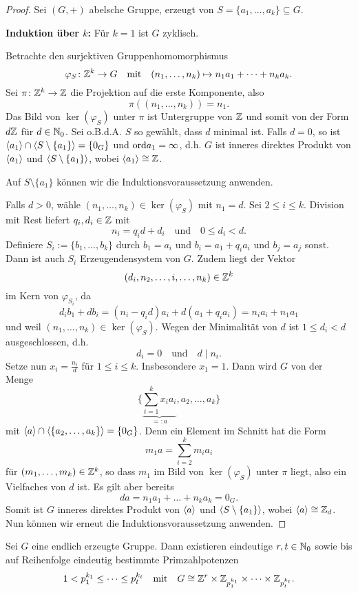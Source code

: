 \begin{proof}
	Sei $(G, +)$ abelsche Gruppe, erzeugt von $S = \{a_1, \dots, a_k\} \subseteq G$. 
	
	\textbf{Induktion über $k$:} Für $k = 1$ ist $G$ zyklisch.
	
	Betrachte den surjektiven Gruppenhomomorphismus
	\[\varphi_S \colon \mathbb{Z}^k \to G \quad\text{mit}\quad(n_1, \dots, n_k) \mapsto n_1a_1 + \dots + n_ka_k.\]
	Sei $\pi \colon \mathbb{Z}^k \to \mathbb{Z}$ die Projektion auf die erste Komponente, also
	\[\pi((n_1, \dots, n_k)) = n_1.\]
	Das Bild von $\ker(\varphi_S)$ unter $\pi$ ist Untergruppe von $\mathbb{Z}$ und somit von der Form $d\mathbb{Z}$ für $d \in \mathbb{N}_0$. Sei o.B.d.A. $S$ so gewählt, dass $d$ minimal ist. Falls $d = 0$, so ist $\langle a_1 \rangle \cap \langle S\setminus\{a_1\} \rangle= \{0_G\}$ und $\mathrm{ord}{a_1} = \infty$, d.h. $G$ ist inneres direktes Produkt von $\langle a_1 \rangle$ und $\langle S\setminus\{a_1\} \rangle$, wobei $\langle a_1 \rangle \cong \mathbb{Z}$.
	
	Auf $S\setminus\{a_1\}$ können wir die Induktionsvoraussetzung anwenden. 
	
	Falls $d > 0$, wähle $(n_1, \dots, n_k) \in \ker(\varphi_S)$ mit $n_1 = d$. Sei $2 \leq i \leq k$. Division mit Rest liefert $q_i, d_i \in \mathbb{Z}$ mit
	\[n_i = q_i d + d_i \quad\text{und}\quad 0 \leq d_i < d.\]
	Definiere $S_i := \{b_1, \dots, b_k\}$ durch $b_1 = a_i$ und $b_i = a_1 + q_i a_i$ und $b_j = a_j$ sonst. Dann ist auch $S_i$ Erzeugendensystem von $G$. Zudem liegt der Vektor
	\[(d_i, n_2, \dots, i, \dots, n_k) \in \mathbb{Z}^k\]
	im Kern von $\varphi_{S_i}$, da
	\[d_ib_1 + db_i = (n_i - q_id)a_i + d(a_1 + q_ia_i) = n_ia_i + n_1a_1\]
	und weil $(n_1, \dots, n_k) \in \ker(\varphi_S)$. Wegen der Minimalität von $d$ ist $1 \leq d_i < d$ ausgeschlossen, d.h.
	\[d_i = 0 \quad\text{und}\quad d \mid n_i.\]
	Setze nun $x_i = \frac{n_i}{d}$ für $1 \leq i \leq k$. Insbesondere $x_1 = 1$. Dann wird $G$ von der Menge
	\[\bigg\{\underbrace{\sum_{i=1}^k x_ia_i}_{=: a} , a_2, \dots, a_k\bigg\}\]
	mit $\langle a \rangle \cap \langle \{a_2, \dots, a_k\} \rangle = \{0_G\}$. Denn ein Element im Schnitt hat die Form 
	\[m_1a = \sum_{i=2}^k m_ia_i\]
	für $(m_1, \dots, m_k) \in \mathbb{Z}^k$, so dass $m_1$ im Bild von $\ker(\varphi_S)$ unter $\pi$ liegt, also ein Vielfaches von $d$ ist. Es gilt aber bereits
	\[da = n_1 a_1 + \dots + n_ka_k = 0_G.\]
	Somit ist $G$ inneres direktes Produkt von $\langle a \rangle$ und $\langle S \setminus \{a_1\} \rangle$, wobei  $\langle a \rangle \cong \mathbb{Z}_d$. Nun können wir erneut die Induktionsvoraussetzung anwenden.
\end{proof}
\begin{kor}\label{kor2_12}
	Sei $G$ eine endlich erzeugte Gruppe. Dann existieren eindeutige $r,t \in \mathbb{N}_0$ sowie bis auf Reihenfolge eindeutig bestimmte Primzahlpotenzen 
	\[1 < p_1^{k_1} \leq \dots \leq p_t^{k_t} \quad\text{mit}\quad G \cong \mathbb{Z}^r \times \mathbb{Z}_{p_1^{k_1}} \times \dots \times \mathbb{Z}_{p_t^{k_t}}.\]
\end{kor}
